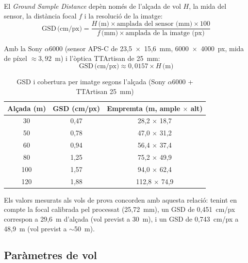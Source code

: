 El \emph{Ground Sample Distance} depèn només de l'alçada de vol $H$, la mida del sensor, la distància focal $f$ i la resolució de la imatge:
\[
\mathrm{GSD}\,\text{(cm/px)} = \frac{H\,\text{(m)} \times \text{amplada del sensor (mm)} \times 100}{f\,\text{(mm)} \times \text{amplada de la imatge (px)}}
\]

Amb la Sony $\alpha$6000 (sensor APS-C de 23,5~$\times$~15,6~mm, 6000~$\times$~4000~px, mida de píxel $\approx 3{,}92$~\textmu m) i l'òptica TTArtisan de 25~mm:
\[
\mathrm{GSD}\,\text{(cm/px)} \approx 0{,}0157 \times H\,\text{(m)}
\]

\begin{table}[H]
    \centering
    \caption{GSD i cobertura per imatge segons l'alçada (Sony $\alpha$6000 + TTArtisan 25~mm)}
    \label{tab:gsd-altura}
    \begin{tabular}{ccc}
        \toprule
        Alçada (m) & GSD (cm/px) & Empremta (m, ample $\times$ alt) \\
        \midrule
        30 & 0,47 & 28,2 $\times$ 18,7 \\
        50 & 0,78 & 47,0 $\times$ 31,2 \\
        60 & 0,94 & 56,4 $\times$ 37,4 \\
        80 & 1,25 & 75,2 $\times$ 49,9 \\
        100 & 1,57 & 94,0 $\times$ 62,4 \\
        120 & 1,88 & 112,8 $\times$ 74,9 \\
        \bottomrule
    \end{tabular}
\end{table}

Els valors mesurats als vols de prova concorden amb aquesta relació: tenint en compte la focal calibrada pel processat (25,72~mm), un GSD de 0,451~cm/px correspon a 29,6~m d'alçada (vol previst a 30~m), i un GSD de 0,743~cm/px a 48,9~m (vol previst a $\sim$50~m).

\subsection{Paràmetres de vol}

